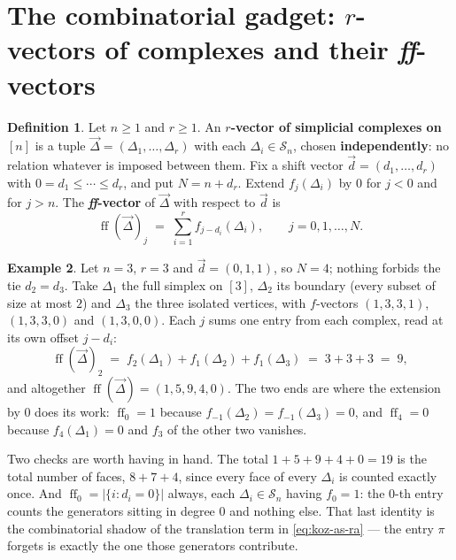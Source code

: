 \documentclass[11pt, a4paper, abstract=yes]{scrartcl}
\theoremstyle{definition}
\newtheorem{definition}{Definition}
\newtheorem{mexample}[definition]{Example}
\theoremstyle{remark}
\theoremstyle{plain}
\newcommand{\proj}{\pi}
\newcommand{\ff}{\operatorname{ff}}
\begin{document}
\section{The combinatorial gadget: \(r\)-vectors of complexes and their \emph{ff}-vectors}
\label{sec-combinatorial}
\begin{definition}
Let \(n\ge1\) and \(r\ge1\). An \textbf{\(r\)-vector of simplicial complexes on
\([n]\)} is a tuple \(\vec\Delta=(\Delta_1,\dots,\Delta_r)\) with each \(\Delta_i\in\mathcal S_n\), chosen
\textbf{independently}: no relation whatever is imposed between them. Fix a shift vector
\(\vec d=(d_1,\dots,d_r)\) with \(0=d_1\le\cdots\le d_r\), and put \(N=n+d_r\). Extend
\(f_j(\Delta_i)\) by \(0\) for \(j<0\) and for \(j>n\). The \textbf{\emph{ff}-vector} of \(\vec\Delta\) with
respect to \(\vec d\) is
\begin{equation}\label{eq:ffvector}
  \ff(\vec\Delta)_j\;=\;\sum_{i=1}^{r}f_{j-d_i}(\Delta_i),\qquad j=0,1,\dots,N .
\end{equation}
\label{def:ffvector}
\label{def-ffvector}
\end{definition}

\begin{mexample}
Let \(n=3\), \(r=3\) and \(\vec d=(0,1,1)\), so \(N=4\); nothing forbids the tie \(d_2=d_3\). Take
\(\Delta_1\) the full simplex on \([3]\), \(\Delta_2\) its boundary (every subset of size at most
\(2\)) and \(\Delta_3\) the three isolated vertices, with \(f\)-vectors
\((1,3,3,1)\), \((1,3,3,0)\) and \((1,3,0,0)\). Each \(j\) sums one entry from each complex, read at
its own offset \(j-d_i\):
\begin{equation}\label{eq:ffvector-ex}
  \ff(\vec\Delta)_2\;=\;f_2(\Delta_1)+f_1(\Delta_2)+f_1(\Delta_3)\;=\;3+3+3\;=\;9,
\end{equation}
and altogether \(\ff(\vec\Delta)=(1,5,9,4,0)\). The two ends are where the extension by \(0\) does its
work: \(\ff_0=1\) because \(f_{-1}(\Delta_2)=f_{-1}(\Delta_3)=0\), and \(\ff_4=0\) because
\(f_4(\Delta_1)=0\) and \(f_3\) of the other two vanishes.

Two checks are worth having in hand. The total \(1+5+9+4+0=19\) is the total number of faces,
\(8+7+4\), since every face of every \(\Delta_i\) is counted exactly once. And
\(\ff_0=\lvert\lbrace i:d_i=0\rbrace\rvert\) always, each \(\Delta_i\in\mathcal S_n\) having
\(f_0=1\): the \(0\)-th entry counts the generators sitting in degree \(0\) and nothing else. That
last identity is the combinatorial shadow of the translation term in \eqref{eq:koz-as-ra} --- the
entry \(\proj\) forgets is exactly the one those generators contribute.
\label{ex-ffvector}
\end{mexample}
\end{document}
